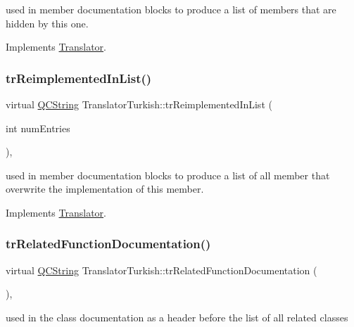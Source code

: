 used in member documentation blocks to produce a list of members that are hidden by this one. 

Implements \mbox{\hyperlink{class_translator}{Translator}}.

\mbox{\label{class_translator_turkish_a063fb59ac0a4f91b0e5c42cba9a0a3c8}} 
\subsubsection{\texorpdfstring{trReimplementedInList()}{trReimplementedInList()}}
{\footnotesize\ttfamily virtual \mbox{\hyperlink{class_q_c_string}{Q\+C\+String}} Translator\+Turkish\+::tr\+Reimplemented\+In\+List (\begin{DoxyParamCaption}\item[{int}]{num\+Entries }\end{DoxyParamCaption})\hspace{0.3cm}{\ttfamily [inline]}, {\ttfamily [virtual]}}

used in member documentation blocks to produce a list of all member that overwrite the implementation of this member. 

Implements \mbox{\hyperlink{class_translator}{Translator}}.

\mbox{\label{class_translator_turkish_ab3d600874fb4925b44d686359f2fc03d}} 
\subsubsection{\texorpdfstring{trRelatedFunctionDocumentation()}{trRelatedFunctionDocumentation()}}
{\footnotesize\ttfamily virtual \mbox{\hyperlink{class_q_c_string}{Q\+C\+String}} Translator\+Turkish\+::tr\+Related\+Function\+Documentation (\begin{DoxyParamCaption}{ }\end{DoxyParamCaption})\hspace{0.3cm}{\ttfamily [inline]}, {\ttfamily [virtual]}}

used in the class documentation as a header before the list of all related classes 


